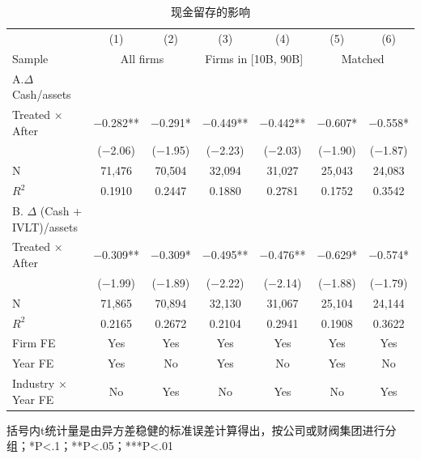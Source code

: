 \documentclass{article}
\begin{document}
\begin{table}[H]
\caption{现金留存的影响}
\centering
\begin{tabular}{lcccccc}
\toprule
                           & (1)            & (2)          & (3)                  & (4)                  & (5)          & (6)          \\ \cmidrule(lr){2-3} \cmidrule(lr){4-5} \cmidrule(lr){6-7} 
Sample                     & \multicolumn{2}{c}{All firms} & \multicolumn{2}{c}{Firms in {[}10B, 90B{]}} & \multicolumn{2}{c}{Matched} \\ \midrule
A.$\Delta$ Cash/assets          &                &              &                      &                      &              &              \\ \midrule
Treated ×   After          & −0.282**       & −0.291*      & −0.449**             & −0.442**             & −0.607*      & −0.558*      \\
                           & (−2.06)        & (−1.95)      & (−2.23)              & (−2.03)              & (−1.90)      & (−1.87)      \\
N                          & 71,476         & 70,504       & 32,094               & 31,027               & 25,043       & 24,083       \\
$R^2$                         & 0.1910         & 0.2447       & 0.1880               & 0.2781               & 0.1752       & 0.3542       \\ \midrule
B. $\Delta$ (Cash + IVLT)/assets &                &              &                      &                      &              &              \\ \midrule
Treated ×   After          & −0.309**       & −0.309*      & −0.495**             & −0.476**             & −0.629*      & −0.574*      \\
                           & (−1.99)        & (−1.89)      & (−2.22)              & (−2.14)              & (−1.88)      & (−1.79)      \\
N                          & 71,865         & 70,894       & 32,130               & 31,067               & 25,104       & 24,144       \\
$R^2$                         & 0.2165         & 0.2672       & 0.2104               & 0.2941               & 0.1908       & 0.3622       \\ \midrule
Firm FE                    & Yes            & Yes          & Yes                  & Yes                  & Yes          & Yes          \\
Year FE                    & Yes            & No           & Yes                  & No                   & Yes          & No           \\
Industry ×   Year FE       & No             & Yes          & No                   & Yes                  & No           & Yes          \\ \bottomrule
\end{tabular}
\begin{tablenotes}
    \item 括号内t统计量是由异方差稳健的标准误差计算得出，按公司或财阀集团进行分组；*P<.1；**P<.05；***P<.01
\end{tablenotes}
\end{table}
\end{document}
